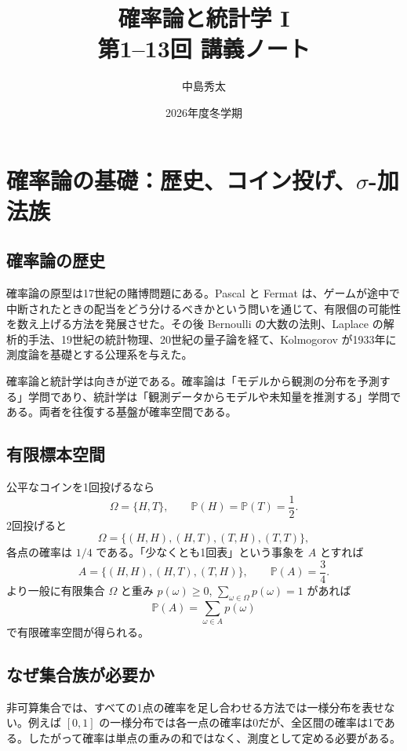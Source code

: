 \documentclass[a4paper,11pt,pdflatex,ja=standard,jafont=ipaex-type1,
  magstyle=real,scale=1]{bxjsarticle}
\title{\bfseries 確率論と統計学 I\\[0.3em]\Large  第1--13回 講義ノート}
\author{中島秀太}
\date{2026年度冬学期}
\theoremstyle{definition}
\theoremstyle{remark}
\newcommand{\Pp}{\mathbb P}
\newcommand{\1}{\mathbf 1}
\begin{document}
\maketitle
\thispagestyle{empty}
\vfill
\begin{center}
\begin{minipage}{0.84\textwidth}
\small
\end{minipage}
\end{center}
\vfill
\clearpage
\tableofcontents
\clearpage

\section{確率論の基礎：歴史、コイン投げ、\texorpdfstring{$\sigma$}{sigma}-加法族}
\subsection{確率論の歴史}
確率論の原型は17世紀の賭博問題にある。Pascal と Fermat は、ゲームが途中で中断されたときの配当をどう分けるべきかという問いを通じて、有限個の可能性を数え上げる方法を発展させた。その後 Bernoulli の大数の法則、Laplace の解析的手法、19世紀の統計物理、20世紀の量子論を経て、Kolmogorov が1933年に測度論を基礎とする公理系を与えた。

確率論と統計学は向きが逆である。確率論は「モデルから観測の分布を予測する」学問であり、統計学は「観測データからモデルや未知量を推測する」学問である。両者を往復する基盤が確率空間である。

\subsection{有限標本空間}
公平なコインを1回投げるなら
\[
\Omega=\{H,T\},\qquad \Pp(H)=\Pp(T)=\frac12.
\]
2回投げると
\[
\Omega=\{(H,H),(H,T),(T,H),(T,T)\},
\]
各点の確率は $1/4$ である。「少なくとも1回表」という事象を $A$ とすれば
\[
A=\{(H,H),(H,T),(T,H)\},\qquad \Pp(A)=\frac34.
\]
より一般に有限集合 $\Omega$ と重み $p(\omega)\ge0$, $\sum_{\omega\in\Omega}p(\omega)=1$ があれば
\[
\Pp(A)=\sum_{\omega\in A}p(\omega)
\]
で有限確率空間が得られる。

\subsection{なぜ集合族が必要か}
非可算集合では、すべての1点の確率を足し合わせる方法では一様分布を表せない。例えば $[0,1]$ の一様分布では各一点の確率は0だが、全区間の確率は1である。したがって確率は単点の重みの和ではなく、測度として定める必要がある。
\end{document}
